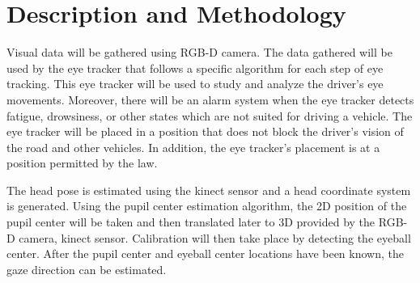 \section{Description and Methodology}

Visual data will be gathered using RGB-D camera. The data gathered will be used by the eye tracker that follows a specific algorithm for each step of eye tracking. This eye tracker will be used to study and analyze the driver’s eye movements. Moreover, there will be an alarm system when the eye tracker detects fatigue, drowsiness, or other states which are not suited for driving a vehicle. The eye tracker will be placed in a position that does not block the driver’s vision of the road and other vehicles. In addition, the eye tracker’s placement is at a position permitted by the law.

The head pose is estimated using the kinect sensor and a head coordinate system is generated. Using the pupil center estimation algorithm, the 2D position of the pupil center will be taken and then translated later to 3D provided by the RGB-D camera, kinect sensor. Calibration will then take place by detecting the eyeball center. After the pupil center and eyeball center locations have been known, the gaze direction can be estimated.


